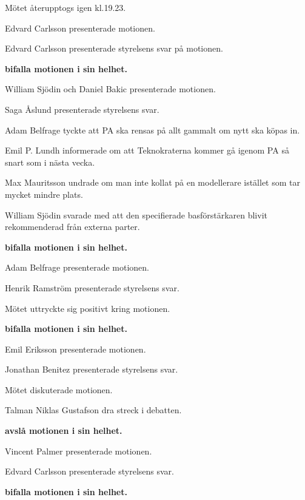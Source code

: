 \documentclass[10pt]{article}
\begin{document}
\begin{paragrafer}
Mötet återupptogs igen kl.19.23.

  \begin{paragrafer}
    Edvard Carlsson presenterade motionen.

    Edvard Carlsson presenterade styrelsens svar på motionen. 

    \textbf{\Mba bifalla motionen i sin helhet.}

    William Sjödin och Daniel Bakic presenterade motionen.

    Saga Åslund presenterade styrelsens svar. 

    Adam Belfrage tyckte att PA ska rensas på allt gammalt om nytt ska köpas in.

    Emil P. Lundh informerade om att Teknokraterna kommer gå igenom PA så snart som i nästa vecka.

    Max Mauritsson undrade om man inte kollat på en modellerare istället som tar mycket mindre plats.

    William Sjödin svarade med att den specifierade basförstärkaren blivit rekommenderad från externa parter.
    
    \textbf{\Mba bifalla motionen i sin helhet.}

    Adam Belfrage presenterade motionen.

    Henrik Ramström presenterade styrelsens svar.

    Mötet uttryckte sig positivt kring motionen.

    \textbf{\Mba bifalla motionen i sin helhet.}

    Emil Eriksson presenterade motionen.

    Jonathan Benitez presenterade styrelsens svar.

    Mötet diskuterade motionen.

    Talman Niklas Gustafson \ypa dra streck i debatten.

    \Mbaby

    \textbf{\Mba avslå motionen i sin helhet.}

    Vincent Palmer presenterade motionen.

    Edvard Carlsson presenterade styrelsens svar.

    \textbf{\Mba bifalla motionen i sin helhet.}


\end{paragrafer}
\end{paragrafer}
\end{document}
